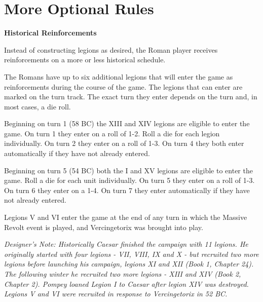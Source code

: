 \pagebreak[4]
\section{More Optional Rules}
\par

\textbf{Historical Reinforcements}

Instead of constructing legions as desired, the Roman player receives reinforcements on a more or less historical schedule.

The Romans have up to six additional legions that will enter the game as reinforcements during the course of the game. The legions that can enter are marked on the turn track. The exact turn they enter depends on the turn and, in most cases, a die roll.

Beginning on turn 1 (58 BC) the XIII and XIV legions are eligible to enter the game. On turn 1 they enter on a roll of 1-2. Roll a die for each legion individually. On turn 2 they enter on a roll of 1-3. On turn 4 they both enter automatically if they have not already entered.

Beginning on turn 5 (54 BC) both the I and XV legions are eligible to enter the game. Roll a die for each unit individually. On turn 5 they enter on a roll of 1-3. On turn 6 they enter on a 1-4. On turn 7 they enter automatically if they have not already entered.

Legions V and VI enter the game at the end of any turn in which the Massive Revolt event is played, and Vercingetorix was brought into play.

\textit{Designer's Note: Historically Caesar finished the campaign with 11 legions. He originally started with four legions - VII, VIII, IX and X - but recruited two more legions before launching his campaign, legions XI and XII (Book 1, Chapter 24). The following winter he recruited two more legions - XIII and XIV (Book 2, Chapter 2). Pompey loaned Legion I to Caesar after legion XIV was destroyed. Legions V and VI were recruited in response to Vercingetorix in 52 BC.}